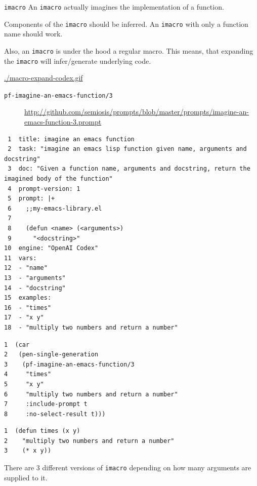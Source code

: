 \documentclass[presentation]{beamer}
\begin{document}
\begin{frame}[label={sec:orgca7a58d},fragile]{\texttt{imacro}}
 An \texttt{imacro} actually imagines the
implementation of a function.

Components of the \texttt{imacro} should be inferred.
An \texttt{imacro} with only a function name should
work.

Also, an \texttt{imacro} is under the hood a regular
macro. This means, that expanding the \texttt{imacro}
will infer/generate underlying code.

\url{./macro-expand-codex.gif}

\begin{description}
\item[{\texttt{pf-imagine-an-emacs-function/3}}] \url{http://github.com/semiosis/prompts/blob/master/prompts/imagine-an-emacs-function-3.prompt}
\end{description}

\begin{verbatim}
 1  title: imagine an emacs function
 2  task: "imagine an emacs lisp function given name, arguments and docstring"
 3  doc: "Given a function name, arguments and docstring, return the imagined body of the function"
 4  prompt-version: 1
 5  prompt: |+
 6    ;;my-emacs-library.el
 7  
 8    (defun <name> (<arguments>)
 9      "<docstring>"
10  engine: "OpenAI Codex"
11  vars:
12  - "name"
13  - "arguments"
14  - "docstring"
15  examples:
16  - "times"
17  - "x y"
18  - "multiply two numbers and return a number"
\end{verbatim}

\begin{verbatim}
1  (car
2   (pen-single-generation
3    (pf-imagine-an-emacs-function/3
4     "times"
5     "x y"
6     "multiply two numbers and return a number"
7     :include-prompt t
8     :no-select-result t)))
\end{verbatim}

\begin{verbatim}
1  (defun times (x y)
2    "multiply two numbers and return a number"
3    (* x y))
\end{verbatim}

There are 3 different versions of \texttt{imacro}
depending on how many arguments are supplied to
it.


\end{frame}
\end{document}
